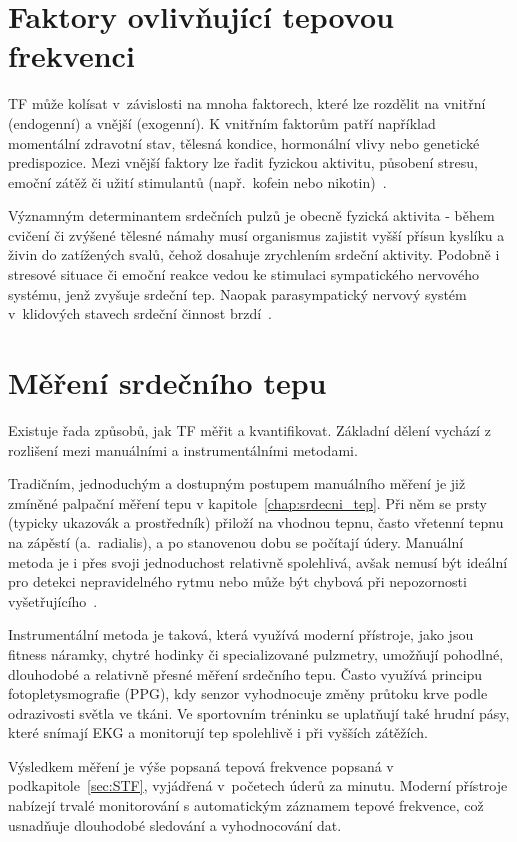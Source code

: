 \section{Faktory ovlivňující tepovou frekvenci}

\acs{TF} může kolísat v~závislosti na mnoha faktorech, které lze rozdělit na vnitřní (endogenní) a vnější (exogenní).
K vnitřním faktorům patří například momentální zdravotní stav, tělesná kondice, hormonální vlivy nebo genetické predispozice.
Mezi vnější faktory lze řadit fyzickou aktivitu, působení stresu, emoční zátěž či užití stimulantů (např.~kofein nebo nikotin)~\cite{faktoryOvlivnujiciTep}.

Významným determinantem srdečních pulzů je obecně fyzická aktivita - během cvičení či zvýšené tělesné námahy musí organismus zajistit vyšší přísun kyslíku a živin do zatížených svalů, čehož dosahuje zrychlením srdeční aktivity.
Podobně i stresové situace či emoční reakce vedou ke stimulaci sympatického nervového systému, jenž zvyšuje srdeční tep.
Naopak parasympatický nervový systém v~klidových stavech srdeční činnost brzdí~\cite{faktoryOvlivnujiciTep}.

\section{Měření srdečního tepu}

Existuje řada způsobů, jak \acs{TF} měřit a kvantifikovat.
Základní dělení vychází z rozlišení mezi manuálními a instrumentálními metodami.

Tradičním, jednoduchým a dostupným postupem manuálního měření je již zmíněné palpační měření tepu v kapitole~\ref{chap:srdecni_tep}.
Při něm se prsty (typicky ukazovák a prostředník) přiloží na vhodnou tepnu, často vřetenní tepnu na zápěstí (a.~radialis), a po stanovenou dobu se počítají údery.
Manuální metoda je i přes svoji jednoduchost relativně spolehlivá, avšak nemusí být ideální pro detekci nepravidelného rytmu nebo může být chybová při nepozornosti vyšetřujícího~\cite{vnitrniLekarstviVKostce}.

Instrumentální metoda je taková, která využívá moderní přístroje, jako jsou fitness náramky, chytré hodinky či specializované pulzmetry, umožňují pohodlné, dlouhodobé a relativně přesné měření srdečního tepu.
Často využívá principu fotopletysmografie (PPG), kdy senzor vyhodnocuje změny průtoku krve podle odrazivosti světla ve tkáni.
Ve sportovním tréninku se uplatňují také hrudní pásy, které snímají EKG a monitorují tep spolehlivě i při vyšších zátěžích.

Výsledkem měření je výše popsaná tepová frekvence popsaná v podkapitole~\ref{sec:STF}, vyjádřená v~početech úderů za minutu.
Moderní přístroje nabízejí trvalé monitorování s automatickým záznamem tepové frekvence, což usnadňuje dlouhodobé sledování a vyhodnocování dat.
